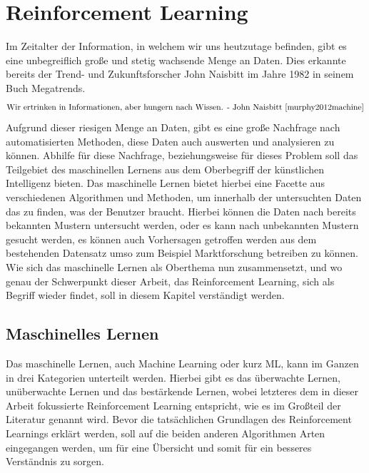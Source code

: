 \documentclass[]{iat}
\begin{document}
\chapter{Reinforcement Learning} \label{sec:reinforcement_learning}
Im Zeitalter der Information, in welchem wir uns heutzutage befinden, gibt es eine unbegreiflich große und stetig wachsende Menge an Daten. Dies erkannte bereits der Trend- und Zukunftsforscher John Naisbitt im Jahre 1982 in seinem Buch Megatrends.
\begin{align*}
    \text{Wir ertrinken in Informationen, aber hungern nach Wissen. - John Naisbitt \cite[]{murphy2012machine}}
\end{align*}
Aufgrund dieser riesigen Menge an Daten, gibt es eine große Nachfrage nach automatisierten Methoden, diese Daten auch auswerten und analysieren zu können. Abhilfe für diese Nachfrage, beziehungsweise für dieses Problem soll das Teilgebiet des maschinellen Lernens aus dem Oberbegriff der künstlichen Intelligenz bieten. Das maschinelle Lernen bietet hierbei eine Facette aus verschiedenen Algorithmen und Methoden, um innerhalb der untersuchten Daten das zu finden, was der Benutzer braucht. Hierbei können die Daten nach bereits bekannten Mustern untersucht werden, oder es kann nach unbekannten Mustern gesucht werden, es können auch Vorhersagen getroffen werden aus dem bestehenden Datensatz umso zum Beispiel Marktforschung betreiben zu können. Wie sich das maschinelle Lernen als Oberthema nun zusammensetzt, und wo genau der Schwerpunkt dieser Arbeit, das Reinforcement Learning, sich als Begriff wieder findet, soll in diesem Kapitel verständigt werden.

\section{Maschinelles Lernen} \label{sec:machine_learning}
Das maschinelle Lernen, auch Machine Learning oder kurz ML, kann im Ganzen in drei Kategorien unterteilt werden. Hierbei gibt es das überwachte Lernen, unüberwachte Lernen und das bestärkende Lernen, wobei letzteres dem in dieser Arbeit fokussierte Reinforcement Learning entspricht, wie es im Großteil der Literatur genannt wird. \cite[]{Sutton1998} Bevor die tatsächlichen Grundlagen des Reinforcement Learnings erklärt werden, soll auf die beiden anderen Algorithmen Arten eingegangen werden, um für eine Übersicht und somit für ein besseres Verständnis zu sorgen.
\end{document}
